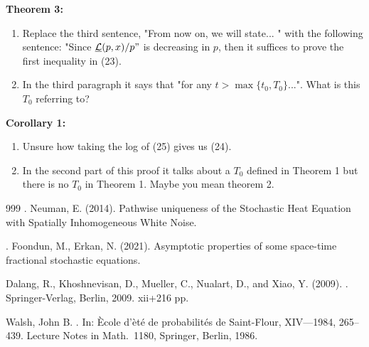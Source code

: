 \documentclass[a4paper,11pt]{article}
\numberwithin{equation}{section}
\numberwithin{equation}{section}
\theoremstyle{plain}
\theoremstyle{definition}
\begin{document}
\textbf{Theorem 3:}
\begin{enumerate}
	\item 
Replace the third sentence, "From now on, we will state... " with the following sentence: "Since $\underline{\mathcal{L}}(p,x)/p"$ is decreasing in $p$, then it suffices to prove the first inequality in (23). 

	\item 
In the third paragraph it says that "for any $t > \max\{t_0,T_0\}$...". What is this $T_0$ referring to? 
\end{enumerate}

\textbf{Corollary 1:}
\begin{enumerate}
	\item 
Unsure how taking the log of (25) gives us (24).

	\item 
In the second part of this proof it talks about a $T_0$ defined in Theorem 1 but there is no $T_0$ in Theorem 1. Maybe you mean theorem 2. 
\end{enumerate}



\begin{thebibliography}{999}
	.
	Neuman, E. (2014).
	\newblock Pathwise uniqueness of the Stochastic Heat Equation with Spatially Inhomogeneous White Noise. 

	.
	Foondun, M., Erkan, N.  (2021).
	\newblock Asymptotic properties of some space-time
	fractional stochastic equations. 
	
	Dalang, R., Khoshnevisan, D., Mueller, C., Nualart, D., and Xiao, Y. (2009).
	.
	\newblock Springer-Verlag, Berlin, 2009. xii+216 pp.
	
	Walsh, John B.
	.
	\newblock In: \`Ecole d'\`et\'e de probabilit\'es de
	Saint-Flour, XIV---1984, 265--439.
	Lecture Notes in Math.\ 1180, Springer, Berlin, 1986.

\end{thebibliography}
\end{document}
